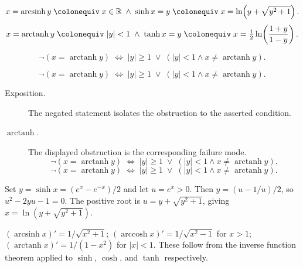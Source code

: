 \begin{remark*}
\[
  x=\operatorname{arcsinh} y
  \;\colonequiv\;
  x\in\mathbb{R} \;\wedge\; \sinh x = y
  \;\colonequiv\;
  x = \ln\!\left(y+\sqrt{y^2+1}\right).
\]
\[
  x=\operatorname{arctanh} y
  \;\colonequiv\;
  |y|<1 \;\wedge\; \tanh x = y
  \;\colonequiv\;
  x = \tfrac{1}{2}\ln\!\left(\frac{1+y}{1-y}\right).
\]
\end{remark*}

\begin{remark*}
\[
  \neg(x=\operatorname{arctanh} y)
  \;\iff\;
  |y|\geq 1 \;\vee\; (|y|<1 \wedge x\neq\operatorname{arctanh} y).
\]
\end{remark*}

\begin{remark*}
\[
\neg(x=\operatorname{arctanh} y)
  \;\iff\;
  |y|\geq 1 \;\vee\; (|y|<1 \wedge x\neq\operatorname{arctanh} y).
\]
\end{remark*}

\begin{remark*}
\begin{description}
  \item[Exposition.]
  The negated statement isolates the obstruction to the asserted condition.

  \item[\(\operatorname{arctanh}.\)]
  The displayed obstruction is the corresponding failure mode.
  \[
\neg(x=\operatorname{arctanh} y)
  \;\iff\;
  |y|\geq 1 \;\vee\; (|y|<1 \wedge x\neq\operatorname{arctanh} y).
  \]
  \[
\neg(x=\operatorname{arctanh} y)
  \;\iff\;
  |y|\geq 1 \;\vee\; (|y|<1 \wedge x\neq\operatorname{arctanh} y).
  \]
\end{description}
\end{remark*}



\begin{remark*}[Interpretation]
Set $y = \sinh x = (e^x - e^{-x})/2$ and let $u = e^x > 0$. Then
$y = (u - 1/u)/2$, so $u^2 - 2yu - 1 = 0$. The positive root is
$u = y + \sqrt{y^2+1}$, giving $x = \ln(y+\sqrt{y^2+1})$.


$(\operatorname{arcsinh} x)' = 1/\sqrt{x^2+1}$;\;
$(\operatorname{arccosh} x)' = 1/\sqrt{x^2-1}$ for $x > 1$;\;
$(\operatorname{arctanh} x)' = 1/(1-x^2)$ for $|x| < 1$.
These follow from the inverse function theorem applied to $\sinh$,
$\cosh$, and $\tanh$ respectively.
\end{remark*}

